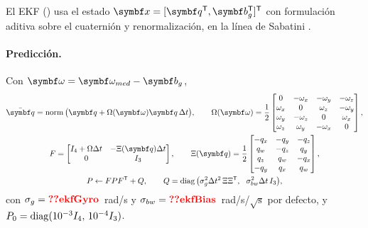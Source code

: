 El EKF () usa el estado $\vect x=[\vect q\T,\vect b_g\T]\T$
con formulación aditiva sobre el cuaternión y renormalización, en la línea
de Sabatini \cite{sabatini06}.

\paragraph{Predicción.} Con $\vect\omega=\vect\omega_{med}-\vect b_g$,
\begin{gather}
\bar{\vect q}=\operatorname{norm}\big(\vect q+\Omega(\vect\omega)\vect q\,\Delta t\big),\qquad
\Omega(\vect\omega)=\frac12\begin{bmatrix}0&-\omega_x&-\omega_y&-\omega_z\\
\omega_x&0&\omega_z&-\omega_y\\ \omega_y&-\omega_z&0&\omega_x\\ \omega_z&\omega_y&-\omega_x&0\end{bmatrix},\\
F=\begin{bmatrix}I_4+\Omega\Delta t & -\Xi(\vect q)\Delta t\\ 0 & I_3\end{bmatrix},\qquad
\Xi(\vect q)=\frac12\begin{bmatrix}-q_x&-q_y&-q_z\\ q_w&-q_z&q_y\\ q_z&q_w&-q_x\\ -q_y&q_x&q_w\end{bmatrix},\\
P\leftarrow FPF\T+Q,\qquad Q=\diag\big(\sigma_g^2\Delta t^2\,\Xi\Xi\T,\ \ \sigma_{bw}^2\Delta t\,I_3\big),
\end{gather}
con $\sigma_g=\val{ekfGyro}$~rad/s y $\sigma_{bw}=\val{ekfBias}$~rad/s/$\sqrt{\text{s}}$
por defecto, y $P_0=\operatorname{diag}(10^{-3}I_4,\,10^{-4}I_3)$.

